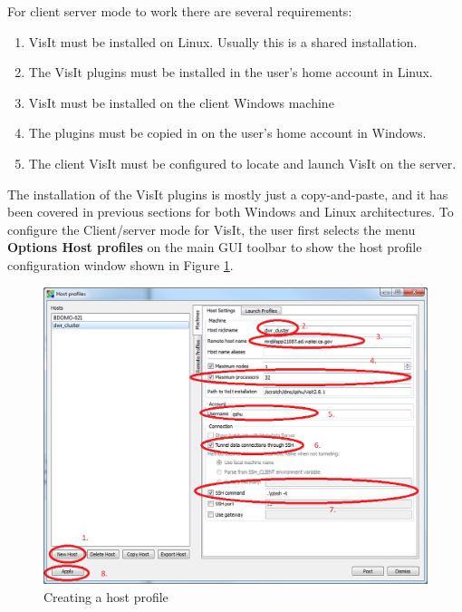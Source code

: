 \documentclass[12pt]{report}
\begin{document}
For client server mode to work there are several requirements:
\begin{enumerate}
\item VisIt must be installed on Linux. Usually this is a shared installation.
\item The VisIt plugins must be installed in the user's home account in Linux. 
\item VisIt must be installed on the client Windows machine
\item The plugins must be copied in on the user's home account in Windows.
\item The client VisIt must be configured to locate and launch VisIt on the server.
\end{enumerate}

The installation of the VisIt plugins is mostly just a copy-and-paste, and it has been covered in previous sections for both Windows and Linux architectures. To configure the Client/server mode for VisIt, the user first selects the menu {\bf Options \textrightarrow Host profiles} on the main GUI toolbar to show the host profile configuration window shown in Figure \ref{figure:setHostProfile}. 

        \begin{figure}
        \begin{center}
        \includegraphics{setHostProfile}
        \caption{Creating a host profile}
        \label{figure:setHostProfile}
        \end{center}
        \end{figure}
\end{document}
